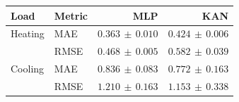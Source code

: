 \begin{center}
\small
\setlength{\tabcolsep}{4pt}
\begin{tabular}{@{}llrr@{}}
\toprule
Load & Metric & MLP & KAN\\
\midrule
Heating & MAE & $0.363\,\pm\,0.010$ & $0.424\,\pm\,0.006$\\
 & RMSE & $0.468\,\pm\,0.005$ & $0.582\,\pm\,0.039$\\
Cooling & MAE & $0.836\,\pm\,0.083$ & $0.772\,\pm\,0.163$\\
 & RMSE & $1.210\,\pm\,0.163$ & $1.153\,\pm\,0.338$\\
\bottomrule
\end{tabular}
\end{center}